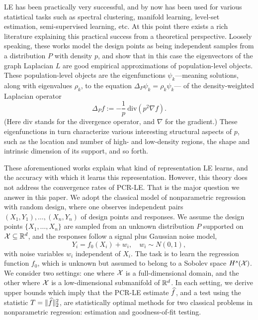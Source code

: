 LE has been practically very successful, and by now has been used for various statistical tasks such as spectral clustering, manifold learning, level-set estimation, semi-supervised learning, etc. At this point there exists a rich literature \citep{koltchinskii2000,belkin07,vonluxburg2008,burago2014,shi2015,singer2017,garciatrillos18,trillos2019, calder2019, cheng2021,dunson2021} explaining this practical success from a theoretical perspective. Loosely speaking, these works model the design points as being independent samples from a distribution $P$ with density $p$, and show that in this case the eigenvectors of the graph Laplacian $L$ are good empirical approximations of population-level objects. These population-level objects are the eigenfunctions $\psi_k$---meaning solutions, along with eigenvalues $\rho_k$, to the equation $\Delta_P \psi_k = \rho_k \psi_k$--- of the density-weighted Laplacian operator
\begin{equation}
\label{eqn:density-weighted-laplace}
\Delta_Pf := -\frac{1}{p}~ \mathrm{div}(p^2 \nabla f).
\end{equation}  
(Here $\mathrm{div}$ stands for the divergence operator, and $\nabla$ for the gradient.) These eigenfunctions in turn characterize various interesting structural aspects of $p$, such as the location and number of high- and low-density regions, the shape and intrinsic dimension of its support, and so forth.

These aforementioned works explain what kind of representation LE learns, and the accuracy with which it learns this representation. However, this theory does not address the convergence rates of PCR-LE. That is the major question we answer in this paper. We adopt the classical model of nonparametric regression with random design, where one observes independent pairs $(X_1,Y_1),\ldots,(X_n,Y_n)$ of design points and responses. We assume the design points $\{X_1,\ldots,X_n\}$ are sampled from an unknown distribution $P$ supported on $\mathcal{X} \subseteq \mathbb{R}^d$, and the responses follow a signal plus Gaussian noise model,
\begin{equation}
\label{eqn:model}
Y_i = f_0(X_i) + w_i, \quad w_i \sim N(0,1),
\end{equation}
with noise variables $w_i$ independent of $X_i$. The task is to learn the regression function $f_0$, which is unknown but assumed to belong to a Sobolev space $H^s(\mathcal{X})$. We consider two settings: one where $\mathcal{X}$ is a full-dimensional domain, and the other where $\mathcal{X}$ is a low-dimensional submanifold of $\mathbb{R}^d$. In each setting, we derive upper bounds which imply that the PCR-LE estimate $\widehat{f}$, and a test using the statistic $T = \|\widehat{f}\|_2^2$, are statistically optimal methods for two classical problems in nonparametric regression: estimation and goodness-of-fit testing. 

